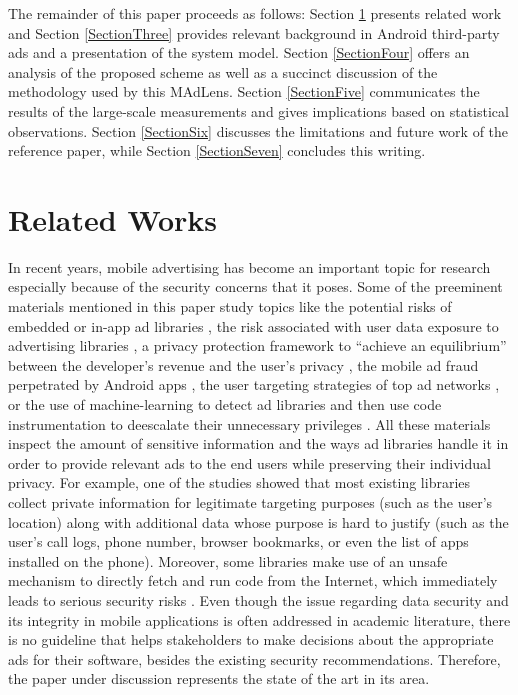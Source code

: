 \documentclass[conference]{IEEEtran}
\begin{document}
The remainder of this paper proceeds as follows: Section \ref{SectionTwo} presents related work and Section \ref{SectionThree} provides relevant background in Android third-party ads and a presentation of the system model. Section \ref{SectionFour} offers an analysis of the proposed scheme as well as a succinct discussion of the methodology used by this MAdLens. Section \ref{SectionFive} communicates the results of the large-scale measurements and gives implications based on statistical observations. Section \ref{SectionSix} discusses the limitations and future work of the reference paper, while Section \ref{SectionSeven} concludes this writing.

\section{Related Works}
\label{SectionTwo}
In recent years, mobile advertising has become an important topic for research especially because of the security concerns that it poses. Some of the preeminent materials mentioned in this paper study topics like the potential risks of embedded or in-app ad libraries \cite{Grace}, the risk associated with user data exposure to advertising libraries \cite{meng2016price}, a privacy protection framework to “achieve an equilibrium” between the developer’s revenue and the user’s privacy \cite{leontiadis2012don}, the mobile ad fraud perpetrated by Android apps \cite{crussell2014madfraud}, the user targeting strategies of top ad networks \cite{nath2015madscope}, or the use of machine-learning to detect ad libraries and then use code instrumentation to deescalate their unnecessary privileges \cite{liu2015efficient}.
All these materials inspect the amount of sensitive information and the ways ad libraries handle it in order to provide relevant ads to the end users while preserving their individual privacy. For example, one of the studies showed that most existing libraries collect private information for legitimate targeting purposes (such as the user’s location) along with additional data whose purpose is hard to justify (such as the user’s call logs, phone number, browser bookmarks, or even the list of apps installed on the phone). Moreover, some libraries make use of an unsafe mechanism to directly fetch and run code from the Internet, which immediately leads to serious security risks \cite{Grace}. 
Even though the issue regarding data security and its integrity in mobile applications is often addressed in academic literature, there is no guideline that helps stakeholders to make decisions about the appropriate ads for their software, besides the existing security recommendations. Therefore, the paper under discussion represents the state of the art in its area.
\end{document}
